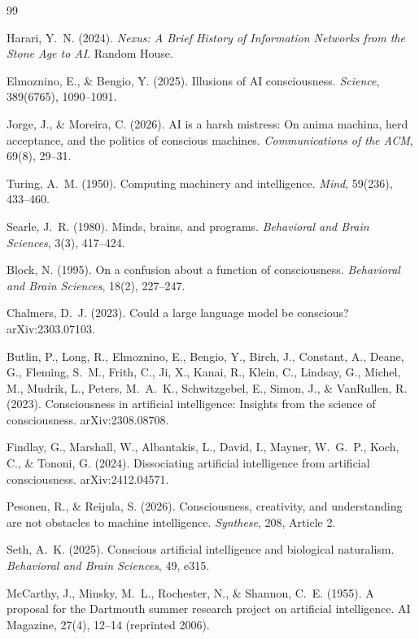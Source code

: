 \documentclass[10pt,fontset=fandol]{ctexart}
\begin{document}
\begin{thebibliography}{99}\small

Harari, Y.~N. (2024).
\emph{Nexus: A Brief History of Information Networks from the Stone Age to AI}.
Random House.

Elmoznino, E., \& Bengio, Y. (2025).
Illusions of AI consciousness.
\emph{Science}, 389(6765), 1090--1091.

Jorge, J., \& Moreira, C. (2026).
AI is a harsh mistress: On anima machina, herd acceptance, and the politics of conscious machines.
\emph{Communications of the ACM}, 69(8), 29--31.

Turing, A.~M. (1950).
Computing machinery and intelligence.
\emph{Mind}, 59(236), 433--460.

Searle, J.~R. (1980).
Minds, brains, and programs.
\emph{Behavioral and Brain Sciences}, 3(3), 417--424.

Block, N. (1995).
On a confusion about a function of consciousness.
\emph{Behavioral and Brain Sciences}, 18(2), 227--247.

Chalmers, D.~J. (2023).
Could a large language model be conscious?
arXiv:2303.07103.

Butlin, P., Long, R., Elmoznino, E., Bengio, Y., Birch, J., Constant, A., Deane, G., Fleming, S.~M., Frith, C., Ji, X., Kanai, R., Klein, C., Lindsay, G., Michel, M., Mudrik, L., Peters, M.~A.~K., Schwitzgebel, E., Simon, J., \& VanRullen, R. (2023).
Consciousness in artificial intelligence: Insights from the science of consciousness.
arXiv:2308.08708.

Findlay, G., Marshall, W., Albantakis, L., David, I., Mayner, W.~G.~P., Koch, C., \& Tononi, G. (2024).
Dissociating artificial intelligence from artificial consciousness.
arXiv:2412.04571.

Pesonen, R., \& Reijula, S. (2026).
Consciousness, creativity, and understanding are not obstacles to machine intelligence.
\emph{Synthese}, 208, Article 2.

Seth, A.~K. (2025).
Conscious artificial intelligence and biological naturalism.
\emph{Behavioral and Brain Sciences}, 49, e315.

McCarthy, J., Minsky, M.~L., Rochester, N., \& Shannon, C.~E. (1955).
A proposal for the Dartmouth summer research project on artificial intelligence.
AI Magazine, 27(4), 12--14 (reprinted 2006).


\end{thebibliography}
\end{document}

